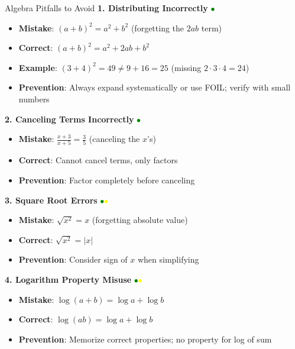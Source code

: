 \documentclass{article}
\begin{document}
\begin{trapbox}{Algebra Pitfalls to Avoid}
\textbf{1. Distributing Incorrectly} \textcolor{green}{$\bullet$}
\begin{itemize}[nosep]
\item \textbf{Mistake}: $(a+b)^2 = a^2 + b^2$ (forgetting the $2ab$ term)
\item \textbf{Correct}: $(a+b)^2 = a^2 + 2ab + b^2$
\item \textbf{Example}: $(3+4)^2 = 49 \neq 9+16 = 25$ (missing $2 \cdot 3 \cdot 4 = 24$)
\item \textbf{Prevention}: Always expand systematically or use FOIL; verify with small numbers
\end{itemize}

\textbf{2. Canceling Terms Incorrectly} \textcolor{green}{$\bullet$}
\begin{itemize}[nosep]
\item \textbf{Mistake}: $\frac{x+3}{x+5} = \frac{3}{5}$ (canceling the $x$'s)
\item \textbf{Correct}: Cannot cancel terms, only factors
\item \textbf{Prevention}: Factor completely before canceling
\end{itemize}

\textbf{3. Square Root Errors} \textcolor{green}{$\bullet$}\textcolor{yellow}{$\bullet$}
\begin{itemize}[nosep]
\item \textbf{Mistake}: $\sqrt{x^2} = x$ (forgetting absolute value)
\item \textbf{Correct}: $\sqrt{x^2} = |x|$
\item \textbf{Prevention}: Consider sign of $x$ when simplifying
\end{itemize}

\textbf{4. Logarithm Property Misuse} \textcolor{green}{$\bullet$}\textcolor{yellow}{$\bullet$}
\begin{itemize}[nosep]
\item \textbf{Mistake}: $\log(a+b) = \log a + \log b$
\item \textbf{Correct}: $\log(ab) = \log a + \log b$
\item \textbf{Prevention}: Memorize correct properties; no property for log of sum
\end{itemize}


\end{trapbox}
\end{document}
